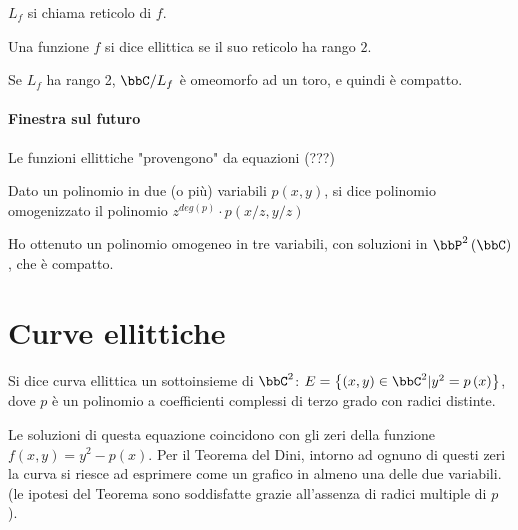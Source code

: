 \begin{definizione}[Reticolo]
$L_f$ si chiama reticolo di $f$.
\end{definizione}

\begin{definizione}
Una funzione $f$ si dice ellittica se il suo reticolo ha rango $2$.
\end{definizione}


\begin{osservazione}
Se $L_f$ ha rango 2, $\bbC / L_f$ è omeomorfo ad un toro, e quindi è compatto.
\end{osservazione}

\paragraph{Finestra sul futuro}
Le funzioni ellittiche "provengono" da equazioni (???)


\begin{definizione}
Dato un polinomio in due (o più) variabili $p\left(x,y\right)$, si dice polinomio omogenizzato il
polinomio $z^{deg\left(p\right)}\cdot p\left(x/z,y/z\right)$
\end{definizione}

\begin{osservazione}
Ho ottenuto un polinomio omogeneo in tre variabili, con soluzioni in $\bbP^2 \left( \bbC \right)$, che è compatto.
\end{osservazione}

\section{Curve ellittiche}
\begin{definizione}
Si dice curva ellittica un sottoinsieme di $\bbC^2$: $E= \left\{\left(x,y \right) \in \bbC^2 | y^2=p \left( x \right) \right\}$, dove $p$ è un polinomio a coefficienti complessi di terzo grado con radici distinte.
\end{definizione}

Le soluzioni di questa equazione coincidono con 
gli zeri della funzione $f \left( x,y \right) = y^2 - p \left( x \right)$.
Per il Teorema del Dini, intorno ad ognuno di questi zeri la curva si riesce ad esprimere come un grafico in almeno una delle due variabili.
(le ipotesi del Teorema sono soddisfatte grazie all'assenza di radici multiple di $p$ ).

